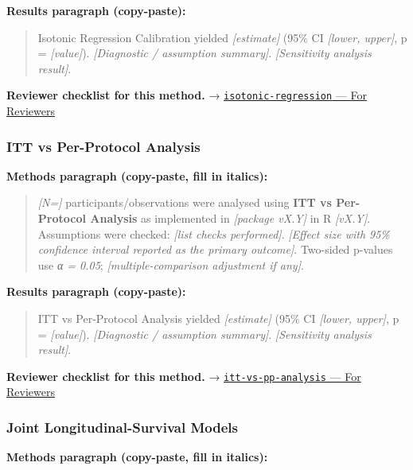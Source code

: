 \documentclass[
]{article}
\begin{document}
\textbf{Results paragraph (copy-paste):}

\begin{quote}
Isotonic Regression Calibration yielded \emph{{[}estimate{]}} (95\% CI
\emph{{[}lower, upper{]}}, p = \emph{{[}value{]}}). \emph{{[}Diagnostic
/ assumption summary{]}}. \emph{{[}Sensitivity analysis result{]}}.
\end{quote}

\textbf{Reviewer checklist for this method.} →
\href{../chapters/13-ml/isotonic-regression.Rmd\#for-reviewers}{\texttt{isotonic-regression}
--- For Reviewers}

\subsubsection{ITT vs Per-Protocol
Analysis}\label{itt-vs-per-protocol-analysis}

\textbf{Methods paragraph (copy-paste, fill in italics):}

\begin{quote}
\emph{{[}N={]}} participants/observations were analysed using
\textbf{ITT vs Per-Protocol Analysis} as implemented in \emph{{[}package
vX.Y{]}} in R \emph{{[}vX.Y{]}}. Assumptions were checked: \emph{{[}list
checks performed{]}}. \emph{{[}Effect size with 95\% confidence interval
reported as the primary outcome{]}}. Two-sided p-values use \emph{α =
0.05}; \emph{{[}multiple-comparison adjustment if any{]}}.
\end{quote}

\textbf{Results paragraph (copy-paste):}

\begin{quote}
ITT vs Per-Protocol Analysis yielded \emph{{[}estimate{]}} (95\% CI
\emph{{[}lower, upper{]}}, p = \emph{{[}value{]}}). \emph{{[}Diagnostic
/ assumption summary{]}}. \emph{{[}Sensitivity analysis result{]}}.
\end{quote}

\textbf{Reviewer checklist for this method.} →
\href{../chapters/14-clinical/itt-vs-pp-analysis.Rmd\#for-reviewers}{\texttt{itt-vs-pp-analysis}
--- For Reviewers}

\subsubsection{Joint Longitudinal-Survival
Models}\label{joint-longitudinal-survival-models}

\textbf{Methods paragraph (copy-paste, fill in italics):}
\end{document}
